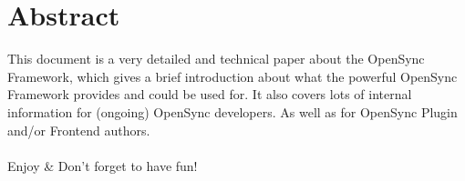 \chapter*{Abstract}
This document is a very detailed and technical paper about the OpenSync 
Framework, which gives a brief introduction about what the powerful OpenSync 
Framework provides and could be used for. It also covers lots of internal 
information for (ongoing) OpenSync developers. As well as for OpenSync Plugin 
and/or Frontend authors.\\
\\
Enjoy \& Don't forget to have fun!
